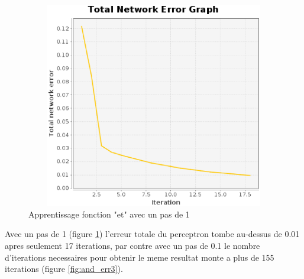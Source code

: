 \documentclass[twoside,openright,a4paper,11pt,french]{article}
\begin{document}
\begin{figure}[h]
\centering
\includegraphics[width=12cm,height=9cm]{./pics/and_error4.eps}
\caption{Apprentissage fonction "et" avec un pas de 1}
\label{fig:and_err4}
\end{figure}

Avec un pas de 1 (figure \ref{fig:and_err4}) l'erreur totale du perceptron
tombe au-dessus de 0.01 apres seulement 17 iterations, par contre avec 
un pas de 0.1 le nombre d'iterations necessaires pour obtenir le meme
resultat monte a plus de 155 iterations (figure \ref{fig:and_err3}).





\end{document}
